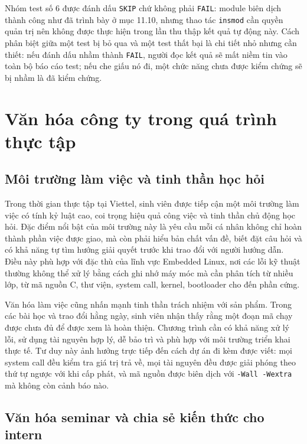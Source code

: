 \documentclass[11pt]{article}
\newcommand{\code}[1]{\texttt{#1}}
\begin{document}
Nhóm test số 6 được đánh dấu \code{SKIP} chứ không phải \code{FAIL}: module biên dịch thành công như đã trình bày ở mục 11.10, nhưng thao tác \code{insmod} cần quyền quản trị nên không được thực hiện trong lần thu thập kết quả tự động này. Cách phân biệt giữa một test bị bỏ qua và một test thất bại là chi tiết nhỏ nhưng cần thiết: nếu đánh dấu nhầm thành \code{FAIL}, người đọc kết quả sẽ mất niềm tin vào toàn bộ báo cáo test; nếu che giấu nó đi, một chức năng chưa được kiểm chứng sẽ bị nhầm là đã kiểm chứng.

\section{Văn hóa công ty trong quá trình thực tập}

\subsection{Môi trường làm việc và tinh thần học hỏi}

Trong thời gian thực tập tại Viettel, sinh viên được tiếp cận một môi trường làm việc có tính kỷ luật cao, coi trọng hiệu quả công việc và tinh thần chủ động học hỏi. Đặc điểm nổi bật của môi trường này là yêu cầu mỗi cá nhân không chỉ hoàn thành phần việc được giao, mà còn phải hiểu bản chất vấn đề, biết đặt câu hỏi và có khả năng tự tìm hướng giải quyết trước khi trao đổi với người hướng dẫn. Điều này phù hợp với đặc thù của lĩnh vực Embedded Linux, nơi các lỗi kỹ thuật thường không thể xử lý bằng cách ghi nhớ máy móc mà cần phân tích từ nhiều lớp, từ mã nguồn C, thư viện, system call, kernel, bootloader cho đến phần cứng.

Văn hóa làm việc cũng nhấn mạnh tinh thần trách nhiệm với sản phẩm. Trong các bài học và trao đổi hằng ngày, sinh viên nhận thấy rằng một đoạn mã chạy được chưa đủ để được xem là hoàn thiện. Chương trình cần có khả năng xử lý lỗi, sử dụng tài nguyên hợp lý, dễ bảo trì và phù hợp với môi trường triển khai thực tế. Tư duy này ảnh hưởng trực tiếp đến cách dự án đi kèm được viết: mọi system call đều kiểm tra giá trị trả về, mọi tài nguyên đều được giải phóng theo thứ tự ngược với khi cấp phát, và mã nguồn được biên dịch với \code{-Wall -Wextra} mà không còn cảnh báo nào.

\subsection{Văn hóa seminar và chia sẻ kiến thức cho intern}
\end{document}
